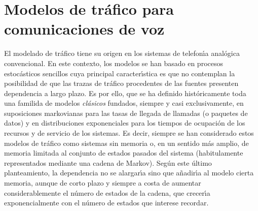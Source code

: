 \newpage 
\section{Modelos de tr\'afico para comunicaciones de voz}  
 
El modelado de tr\'afico tiene su origen en los sistemas de telefon\'{\i}a  
anal\'ogica convencional.  
En este contexto, los modelos se han basado en procesos estoc\'asticos sencillos 
cuya principal caracter\'{\i}stica es que no contemplan la posibilidad de que  
las trazas de tr\'afico procedentes de las fuentes presenten dependencia a largo 
plazo. 
Es por ello, que se ha definido hist\'oricamente toda una familida de modelos 
{\em cl\'asicos} fundados, siempre y casi exclusivamente, en suposiciones  
markovianas para las tasas de llegada de llamadas (o paquetes de datos) y en  
distribuciones exponenciales para los tiempos de ocupaci\'on de los recursos y 
de servicio de los sistemas. Es decir, siempre se han considerado estos  
modelos de tr\'afico como sistemas sin memoria o, en un sentido m\'as amplio, 
de memoria limitada al conjunto de estados pasados del sistema (habitulamente 
representados mediante una cadena de Markov). 
Seg\'un este \'ultimo planteamiento, la dependencia no se alargar\'{\i}a sino 
que a\~nadir\'{\i}a al modelo cierta memoria, aunque de corto plazo y siempre  
a costa de aumentar considerablemente el n\'umero de estados de la cadena, que  
crecer\'{\i}a exponencialmente con el n\'umero de estados que interese recordar. 
 
